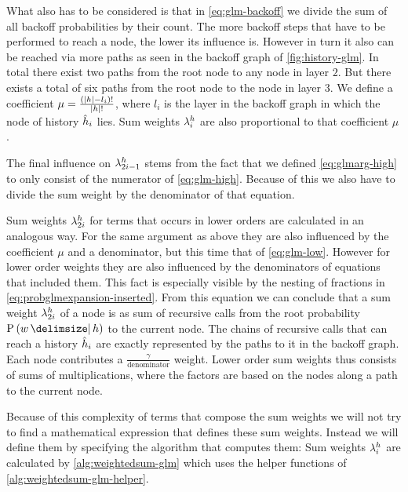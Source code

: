 What also has to be considered is that in \cref{eq:glm-backoff} we divide the
sum of all backoff probabilities by their count.
The more backoff steps that have to be performed to reach a node, the lower its
influence is.
However in turn it also can be reached via more paths as seen in the backoff
graph of \cref{fig:history-glm}.
In total there exist two paths from the root node to any node in layer $2$.
But there exists a total of six paths from the root node to the node in layer
$3$.
We define a coefficient $\mu = \frac{({\left|h\right|} - l_i)!}{{\left|h\right|}!}$,
where $l_i$ is the layer in the backoff graph in which the node of history
$\DerivedHistory[i]$ lies.
Sum weights $\lambda^h_i$ are also proportional to that coefficient $\mu$.

The final influence on $\lambda^h_{2 i - 1}$ stems from the fact that we
defined \cref{eq:glmarg-high} to only consist of the numerator of
\cref{eq:glm-high}.
Because of this we also have to divide the sum weight by the denominator of
that equation.

Sum weights $\lambda^h_{2 i}$ for terms that occurs in lower orders are
calculated in an analogous way.
For the same argument as above they are also influenced by the coefficient
$\mu$ and a denominator, but this time that of \cref{eq:glm-low}.
However for lower order weights they are also influenced by the denominators
of equations that included them.
This fact is especially visible by the nesting of fractions in
\cref{eq:probglmexpansion-inserted}.
From this equation we can conclude that a sum weight $\lambda^h_{2 i}$ of a
node is as sum of recursive calls from the root probability $\Prob{w}{h}$ to
the current node.
The chains of recursive calls that can reach a history $\DerivedHistory[i]$ are
exactly represented by the paths to it in the backoff graph.
Each node contributes a $\frac{\gamma}{\text{denominator}}$ weight.
Lower order sum weights thus consists of sums of multiplications, where the
factors are based on the nodes along a path to the current node.

Because of this complexity of terms that compose the sum weights we will not try
to find a mathematical expression that defines these sum weights.
Instead we will define them by specifying the algorithm that computes them:
Sum weights $\lambda^h_i$ are calculated by \cref{alg:weightedsum-glm} which
uses the helper functions of \cref{alg:weightedsum-glm-helper}.


